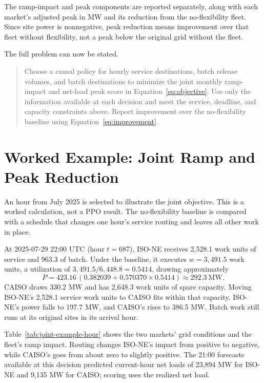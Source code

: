 \documentclass{UNCC-thesis}
\begin{document}
The ramp-impact and peak components are reported separately, along with
each market's adjusted peak in MW and its reduction from
the no-flexibility fleet. Since site power is nonnegative, peak reduction
means improvement over that fleet without flexibility, not a peak below the
original grid without the fleet.

The full problem can now be stated.
\label{subsec:problem-formal-statement}

\begin{quote}
Choose a causal policy for hourly service destinations, batch release
volumes, and batch destinations to minimize the joint monthly ramp-impact and
net-load peak score in Equation~\eqref{eq:objective}. Use only the
information available at each decision and meet the service, deadline, and
capacity constraints above. Report improvement over the no-flexibility
baseline using Equation~\eqref{eq:improvement}.
\end{quote}


\section{Worked Example: Joint Ramp and Peak Reduction}
\label{subsec:problem-worked-joint}

An hour from July 2025 is selected to illustrate the joint
objective. This is a worked calculation, not a PPO result. The
no-flexibility baseline is compared with a schedule that changes one hour's
service routing and leaves all other work in place.

At 2025-07-29 22:00 UTC (hour \(t=687\)), ISO-NE receives 2,528.1 work
units of service and 963.3 of batch. Under the baseline, it executes
\(w=3{,}491.5\) work units, a utilization of \(3{,}491.5/6{,}448.8=0.5414\), drawing
approximately
\begin{equation*}
  P = 423.16\,(0.382039 + 0.570370 \times 0.5414)
  \approx 292.3\ \mathrm{MW}.
\end{equation*}
CAISO draws 330.2 MW and has 2,648.3 work units of spare capacity.
Moving ISO-NE's 2,528.1 service work units to CAISO fits within that capacity.
ISO-NE's power falls to 197.7 MW, and CAISO's rises to 386.5 MW. Batch work
still runs at its original sites in its arrival hour.

Table~\ref{tab:joint-example-hour} shows the two markets' grid conditions
and the fleet's ramp impact. Routing changes ISO-NE's impact from positive
to negative, while CAISO's goes from about zero to slightly positive.
The 21:00 forecasts available at this decision
predicted current-hour net loads of 23,894 MW for ISO-NE and
9,135 MW for CAISO; scoring uses the realized net load.
\end{document}
